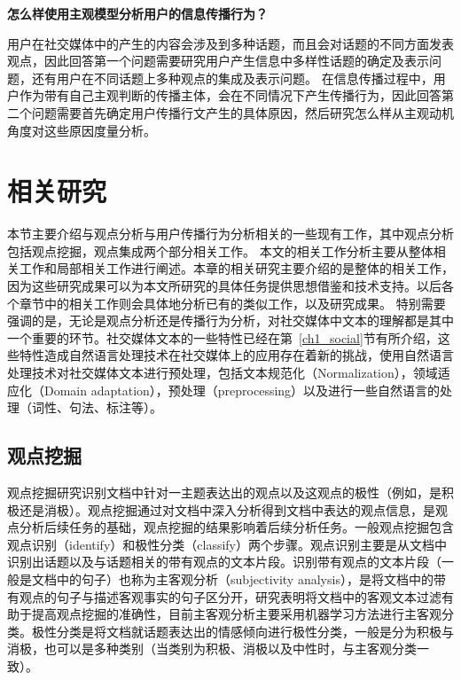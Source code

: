 \textbf{怎么样使用主观模型分析用户的信息传播行为？}

用户在社交媒体中的产生的内容会涉及到多种话题，而且会对话题的不同方面发表观点，因此回答第一个问题需要研究用户产生信息中多样性话题的确定及表示问题，还有用户在不同话题上多种观点的集成及表示问题。
在信息传播过程中，用户作为带有自己主观判断的传播主体，会在不同情况下产生传播行为，因此回答第二个问题需要首先确定用户传播行文产生的具体原因，然后研究怎么样从主观动机角度对这些原因度量分析。

\section{相关研究}
本节主要介绍与观点分析与用户传播行为分析相关的一些现有工作，其中观点分析包括观点挖掘，观点集成两个部分相关工作。
本文的相关工作分析主要从整体相关工作和局部相关工作进行阐述。本章的相关研究主要介绍的是整体的相关工作，因为这些研究成果可以为本文所研究的具体任务提供思想借鉴和技术支持。以后各个章节中的相关工作则会具体地分析已有的类似工作，以及研究成果。
特别需要强调的是，无论是观点分析还是传播行为分析，对社交媒体中文本的理解都是其中一个重要的环节。社交媒体文本的一些特性已经在第~\ref{ch1_social}节有所介绍，这些特性造成自然语言处理技术在社交媒体上的应用存在着新的挑战，使用自然语言处理技术对社交媒体文本进行预处理，包括文本规范化（Normalization），领域适应化（Domain adaptation），预处理（preprocessing）以及进行一些自然语言的处理（词性、句法、标注等）。

\subsection{观点挖掘}
\label{ch_mining}
观点挖掘研究识别文档中针对一主题表达出的观点以及这观点的极性（例如，是积极还是消极）。观点挖掘通过对文档中深入分析得到文档中表达的观点信息，是观点分析后续任务的基础，观点挖掘的结果影响着后续分析任务。一般观点挖掘包含观点识别（identify）和极性分类（classify）两个步骤。观点识别主要是从文档中识别出话题以及与话题相关的带有观点的文本片段。识别带有观点的文本片段（一般是文档中的句子）也称为主客观分析（subjectivity analysis），是将文档中的带有观点的句子与描述客观事实的句子区分开，研究表明将文档中的客观文本过滤有助于提高观点挖掘的准确性，目前主客观分析主要采用机器学习方法进行主客观分类。极性分类是将文档就话题表达出的情感倾向进行极性分类，一般是分为积极与消极，也可以是多种类别（当类别为积极、消极以及中性时，与主客观分类一致）。

